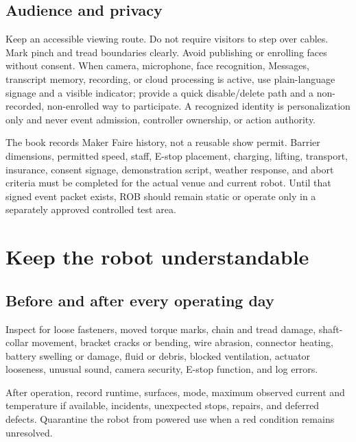 \documentclass[10pt,openany]{book}
\begin{document}
\section{Audience and privacy}

Keep an accessible viewing route. Do not require visitors to step over cables. Mark pinch and tread boundaries clearly. Avoid publishing or enrolling faces without consent. When camera, microphone, face recognition, Messages, transcript memory, recording, or cloud processing is active, use plain-language signage and a visible indicator; provide a quick disable/delete path and a non-recorded, non-enrolled way to participate. A recognized identity is personalization only and never event admission, controller ownership, or action authority.

\begin{safetybox}[title={EVENT PLAN IS VENUE-SPECIFIC}]
The book records Maker Faire history, not a reusable show permit. Barrier dimensions, permitted speed, staff, E-stop placement, charging, lifting, transport, insurance, consent signage, demonstration script, weather response, and abort criteria must be completed for the actual venue and current robot. Until that signed event packet exists, ROB should remain static or operate only in a separately approved controlled test area.
\end{safetybox}


\chapter{Keep the robot understandable}

\section{Before and after every operating day}

Inspect for loose fasteners, moved torque marks, chain and tread damage, shaft-collar movement, bracket cracks or bending, wire abrasion, connector heating, battery swelling or damage, fluid or debris, blocked ventilation, actuator looseness, unusual sound, camera security, E-stop function, and log errors.

After operation, record runtime, surfaces, mode, maximum observed current and temperature if available, incidents, unexpected stops, repairs, and deferred defects. Quarantine the robot from powered use when a red condition remains unresolved.
\end{document}
